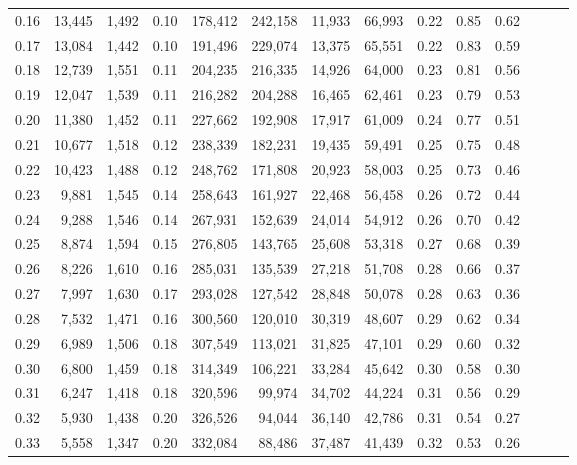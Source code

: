 \begin{tabular}{rrrrrrrrrrrrrr}
0.16 &  13,445 &  1,492 &  0.10 &  178,412 &  242,158 &  11,933 &  66,993 &  0.22 &  0.85 &      0.62 \\
0.17 &  13,084 &  1,442 &  0.10 &  191,496 &  229,074 &  13,375 &  65,551 &  0.22 &  0.83 &      0.59 \\
0.18 &  12,739 &  1,551 &  0.11 &  204,235 &  216,335 &  14,926 &  64,000 &  0.23 &  0.81 &      0.56 \\
0.19 &  12,047 &  1,539 &  0.11 &  216,282 &  204,288 &  16,465 &  62,461 &  0.23 &  0.79 &      0.53 \\
0.20 &  11,380 &  1,452 &  0.11 &  227,662 &  192,908 &  17,917 &  61,009 &  0.24 &  0.77 &      0.51 \\
0.21 &  10,677 &  1,518 &  0.12 &  238,339 &  182,231 &  19,435 &  59,491 &  0.25 &  0.75 &      0.48 \\
0.22 &  10,423 &  1,488 &  0.12 &  248,762 &  171,808 &  20,923 &  58,003 &  0.25 &  0.73 &      0.46 \\
0.23 &   9,881 &  1,545 &  0.14 &  258,643 &  161,927 &  22,468 &  56,458 &  0.26 &  0.72 &      0.44 \\
0.24 &   9,288 &  1,546 &  0.14 &  267,931 &  152,639 &  24,014 &  54,912 &  0.26 &  0.70 &      0.42 \\
0.25 &   8,874 &  1,594 &  0.15 &  276,805 &  143,765 &  25,608 &  53,318 &  0.27 &  0.68 &      0.39 \\
0.26 &   8,226 &  1,610 &  0.16 &  285,031 &  135,539 &  27,218 &  51,708 &  0.28 &  0.66 &      0.37 \\
0.27 &   7,997 &  1,630 &  0.17 &  293,028 &  127,542 &  28,848 &  50,078 &  0.28 &  0.63 &      0.36 \\
0.28 &   7,532 &  1,471 &  0.16 &  300,560 &  120,010 &  30,319 &  48,607 &  0.29 &  0.62 &      0.34 \\
0.29 &   6,989 &  1,506 &  0.18 &  307,549 &  113,021 &  31,825 &  47,101 &  0.29 &  0.60 &      0.32 \\
0.30 &   6,800 &  1,459 &  0.18 &  314,349 &  106,221 &  33,284 &  45,642 &  0.30 &  0.58 &      0.30 \\
0.31 &   6,247 &  1,418 &  0.18 &  320,596 &   99,974 &  34,702 &  44,224 &  0.31 &  0.56 &      0.29 \\
0.32 &   5,930 &  1,438 &  0.20 &  326,526 &   94,044 &  36,140 &  42,786 &  0.31 &  0.54 &      0.27 \\
0.33 &   5,558 &  1,347 &  0.20 &  332,084 &   88,486 &  37,487 &  41,439 &  0.32 &  0.53 &      0.26 \\

\end{tabular}
